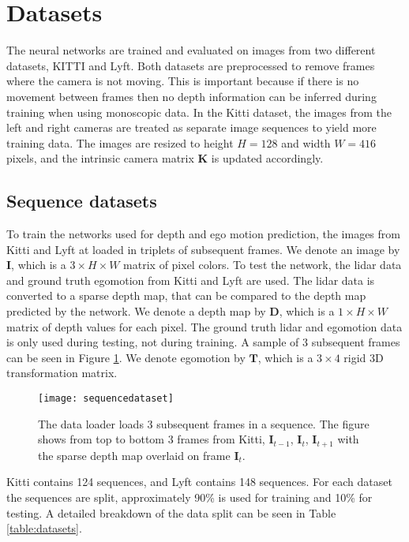 \section{Datasets}

The neural networks are trained and evaluated on images from two different datasets, KITTI\cite{kitti} and Lyft\cite{lyft2019}. Both datasets are preprocessed to remove frames where the camera is not moving. This is important because if there is no movement between frames then no depth information can be inferred during training when using monoscopic data. In the Kitti dataset, the images from the left and right cameras are treated as separate image sequences to yield more training data. The images are resized to height $H=128$ and width $W=416$ pixels, and the intrinsic camera matrix $\textbf{K}$ is updated accordingly.

\subsection{Sequence datasets}

To train the networks used for depth and ego motion prediction, the images from Kitti and Lyft at loaded in triplets of subsequent frames. We denote an image by $\textbf{I}$, which is a $3\times H\times W$ matrix of \abbrRGB pixel colors. To test the network, the lidar data and ground truth egomotion from Kitti and Lyft are used. The lidar data is converted to a sparse depth map, that can be compared to the depth map predicted by the network. We denote a depth map by $\textbf{D}$, which is a $1\times H \times W$ matrix of depth values for each pixel. The ground truth lidar and egomotion data is only used during testing, not during training. A sample of 3 subsequent frames can be seen in Figure \ref{fig:sequencedataset}. We denote egomotion by $\textbf{T}$, which is a $3\times 4$ rigid 3D transformation matrix.

\begin{figure}[H]
	\centering
	\texttt{[image: sequencedataset]}
	\caption{The data loader loads 3 subsequent frames in a sequence. The figure shows from top to bottom 3 frames from Kitti, $\textbf{I}_{t-1}$, $\textbf{I}_t$, $\textbf{I}_{t+1}$ with the sparse depth map overlaid on frame $\textbf{I}_t$.}
	\label{fig:sequencedataset}
\end{figure}

Kitti contains 124 sequences, and Lyft contains 148 sequences. For each dataset the sequences are split, approximately 90\% is used for training and 10\% for testing. A detailed breakdown of the data split can be seen in Table \ref{table:datasets}.

